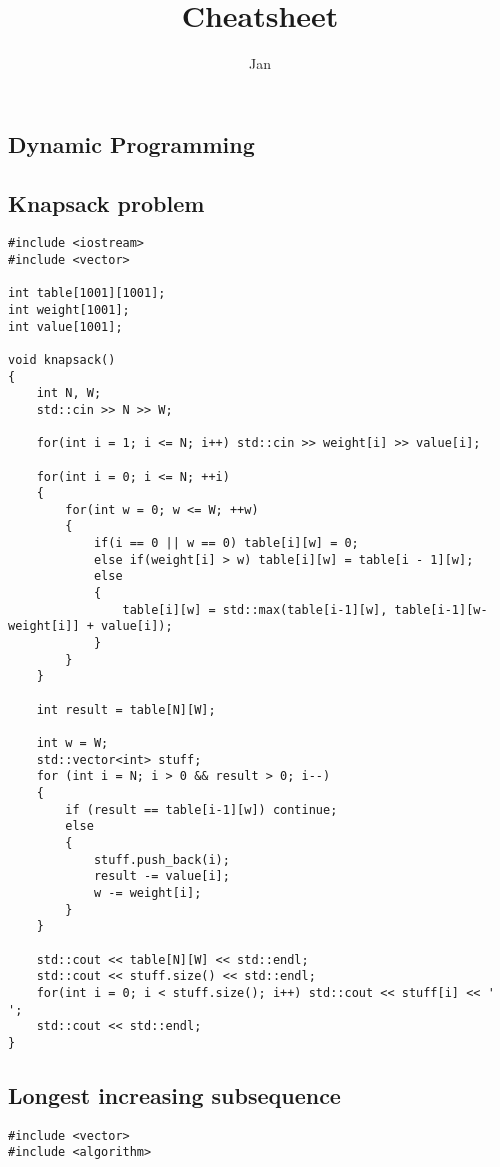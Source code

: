 \documentclass[10pt,a4paper,landscape,twosided]{extarticle}
\begin{document}
\title{Cheatsheet}
\author{Jan}
\maketitle
\begin{multicols}{2}

\tableofcontents
{}
\section{Dynamic Programming}

\subsection{Knapsack problem}
\begin{lstlisting}
#include <iostream>
#include <vector>

int table[1001][1001];
int weight[1001];
int value[1001];

void knapsack()
{
    int N, W;
    std::cin >> N >> W;

    for(int i = 1; i <= N; i++) std::cin >> weight[i] >> value[i];

    for(int i = 0; i <= N; ++i)
    {
        for(int w = 0; w <= W; ++w)
        {
            if(i == 0 || w == 0) table[i][w] = 0;
            else if(weight[i] > w) table[i][w] = table[i - 1][w];
            else
            {
                table[i][w] = std::max(table[i-1][w], table[i-1][w-weight[i]] + value[i]);
            }
        }
    }

    int result = table[N][W];
    
    int w = W;
    std::vector<int> stuff;
    for (int i = N; i > 0 && result > 0; i--) 
    {
        if (result == table[i-1][w]) continue;   
        else 
        {
            stuff.push_back(i);
            result -= value[i];
            w -= weight[i];
        }
    }

    std::cout << table[N][W] << std::endl;
    std::cout << stuff.size() << std::endl;
    for(int i = 0; i < stuff.size(); i++) std::cout << stuff[i] << ' ';
    std::cout << std::endl;
}
\end{lstlisting}

\subsection{Longest increasing subsequence}
\begin{lstlisting}
#include <vector>
#include <algorithm>


\end{lstlisting}
\end{multicols}
\end{document}
